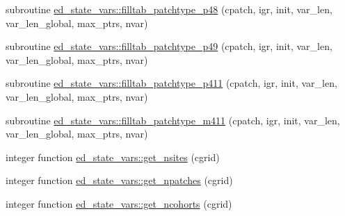 \begin{DoxyCompactItemize}
\item 
subroutine \hyperlink{namespaceed__state__vars_a5d63e58eeaff5d95d688b551f909aff4}{ed\+\_\+state\+\_\+vars\+::filltab\+\_\+patchtype\+\_\+p48} (cpatch, igr, init, var\+\_\+len, var\+\_\+len\+\_\+global, max\+\_\+ptrs, nvar)
\item 
subroutine \hyperlink{namespaceed__state__vars_aacba61eceab235a0ea8a293671b4d340}{ed\+\_\+state\+\_\+vars\+::filltab\+\_\+patchtype\+\_\+p49} (cpatch, igr, init, var\+\_\+len, var\+\_\+len\+\_\+global, max\+\_\+ptrs, nvar)
\item 
subroutine \hyperlink{namespaceed__state__vars_afa3fe02474e668980d731221824ae0ab}{ed\+\_\+state\+\_\+vars\+::filltab\+\_\+patchtype\+\_\+p411} (cpatch, igr, init, var\+\_\+len, var\+\_\+len\+\_\+global, max\+\_\+ptrs, nvar)
\item 
subroutine \hyperlink{namespaceed__state__vars_ad37021d612198bd02a104790ed58446c}{ed\+\_\+state\+\_\+vars\+::filltab\+\_\+patchtype\+\_\+m411} (cpatch, igr, init, var\+\_\+len, var\+\_\+len\+\_\+global, max\+\_\+ptrs, nvar)
\item 
integer function \hyperlink{namespaceed__state__vars_a71180ecf4c468babd534e14d280a688b}{ed\+\_\+state\+\_\+vars\+::get\+\_\+nsites} (cgrid)
\item 
integer function \hyperlink{namespaceed__state__vars_a87bcc335f1f8acbb6c87d33101c60e61}{ed\+\_\+state\+\_\+vars\+::get\+\_\+npatches} (cgrid)
\item 
integer function \hyperlink{namespaceed__state__vars_a3bec61b0abda2eb04c29f131b1130f37}{ed\+\_\+state\+\_\+vars\+::get\+\_\+ncohorts} (cgrid)
\end{DoxyCompactItemize}
